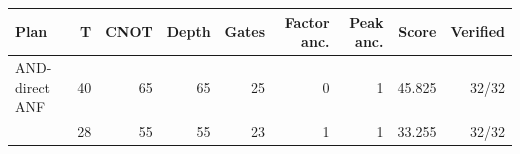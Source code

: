 \begin{tabular}{lrrrrrrrr}
\toprule
Plan & T & CNOT & Depth & Gates & Factor anc. & Peak anc. & Score & Verified \\
\midrule
AND-direct ANF & 40 & 65 & 65 & 25 & 0 & 1 & 45.825 & 32/32 \\
\method{} & 28 & 55 & 55 & 23 & 1 & 1 & 33.255 & 32/32 \\
\bottomrule
\end{tabular}
